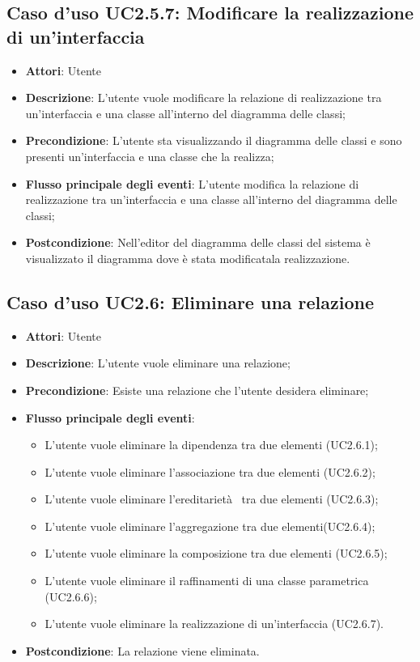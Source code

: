 \documentclass[../AnalisiDeiRequisiti.tex]{subfiles}
\begin{document}
		\subsection{Caso d'uso UC2.5.7: Modificare la realizzazione di un'interfaccia}
		\begin{itemize}
			\item \textbf{Attori}: Utente
			\item \textbf{Descrizione}: L'utente vuole modificare la relazione di realizzazione tra un'interfaccia e una classe all'interno del diagramma delle classi;
			\item \textbf{Precondizione}: L'utente sta visualizzando il diagramma delle classi e sono presenti un'interfaccia e una classe che la realizza;
			\item \textbf{Flusso principale degli eventi}: L'utente modifica la relazione di realizzazione tra un'interfaccia e una classe all'interno del diagramma delle classi;
			\item \textbf{Postcondizione}: Nell'editor del diagramma delle classi del sistema è visualizzato il diagramma dove è stata modificatala realizzazione.
		\end{itemize}
		\subsection{Caso d'uso UC2.6: Eliminare una relazione}
		\begin{itemize}
			\item \textbf{Attori}: Utente
			\item \textbf{Descrizione}: L'utente vuole eliminare una relazione;
			\item \textbf{Precondizione}: Esiste una relazione che l'utente desidera eliminare;
			\item \textbf{Flusso principale degli eventi}: \begin{itemize}
				\item L'utente vuole eliminare la dipendenza tra due elementi (UC2.6.1);
				\item L'utente vuole eliminare l'associazione tra due elementi (UC2.6.2);
				\item L'utente vuole eliminare l'ereditarietà  tra due elementi (UC2.6.3);
				\item L'utente vuole eliminare l'aggregazione tra due elementi(UC2.6.4);
				\item L'utente vuole eliminare la composizione tra due elementi (UC2.6.5);
				\item L'utente vuole eliminare il raffinamenti di una classe parametrica (UC2.6.6);
				\item L'utente vuole eliminare la realizzazione di un'interfaccia (UC2.6.7).
			\end{itemize}
			\item \textbf{Postcondizione}: La relazione viene eliminata.
		\end{itemize}
\end{document}
